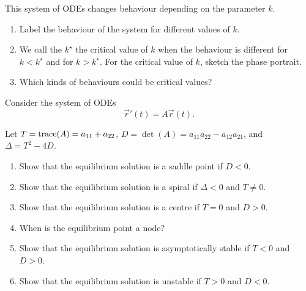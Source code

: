 \begin{exercises}
\begin{problist}
	This system of ODEs changes behaviour depending on the parameter $k$.
	\begin{enumerate}
		\item Label the behaviour of the system for different values of $k$.
		\item We call the $k^\star$ the critical value of $k$ when the behaviour is different for $k<k^\star$ and for $k>k^\star$. For the critical value of $k$, sketch the phase portrait.
		\item Which kinds of behaviours could be critical values?
	\end{enumerate}
	
	
	
	\prob Consider the system of ODEs
	$$
	\vec{r}'(t) = A \vec{r}(t).
	$$
	
	Let $T={\rm trace}(A) = a_{11}+a_{22}$, $D=\det(A) = a_{11}a_{22} - a_{12}a_{21}$, and $\Delta = T^2-4D$.
	
	\begin{enumerate}
		\item Show that the equilibrium solution is a saddle point if $D<0$.
		\item Show that the equilibrium solution is a spiral if $\Delta<0$ and $T\neq 0$.
		\item Show that the equilibrium solution is a centre if $T=0$ and $D>0$.
		\item When is the equilibrium point a node? \\

		\item Show that the equilibrium solution is asymptotically stable if $T<0$ and $D>0$.
		\item Show that the equilibrium solution is unstable if $T>0$ and $D<0$.
	\end{enumerate}






	\end{problist}
\end{exercises}
